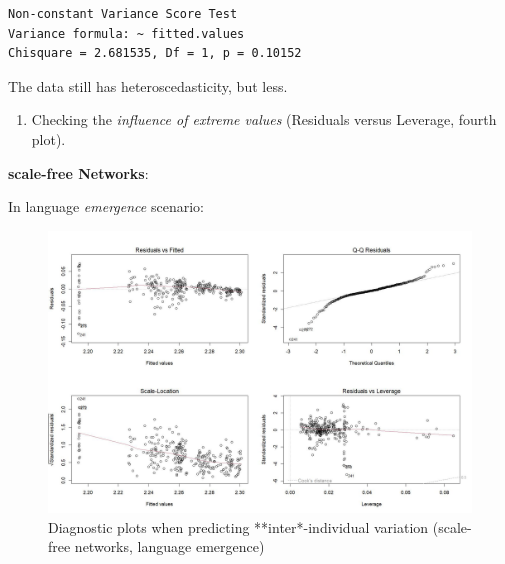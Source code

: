 \documentclass[
]{article}
\providecommand{\tightlist}{%
  \setlength{\itemsep}{0pt}\setlength{\parskip}{0pt}}
\begin{document}
\begin{verbatim}
Non-constant Variance Score Test 
Variance formula: ~ fitted.values 
Chisquare = 2.681535, Df = 1, p = 0.10152
\end{verbatim}

The data still has heteroscedasticity, but less.

\begin{enumerate}
\def\labelenumi{\arabic{enumi}.}
\setcounter{enumi}{3}
\tightlist
\item
  Checking the \emph{influence of extreme values} (Residuals versus
  Leverage, fourth plot).
\end{enumerate}

\textbf{scale-free Networks}:

In language \emph{emergence} scenario:

\begin{figure}[!H]

{\centering \includegraphics{./Figures/unnamed-chunk-131-1} 

}

\caption{Diagnostic plots when predicting **inter*-individual variation (scale-free networks, language emergence)}\label{fig:unnamed-chunk-131}
\end{figure}
\end{document}
